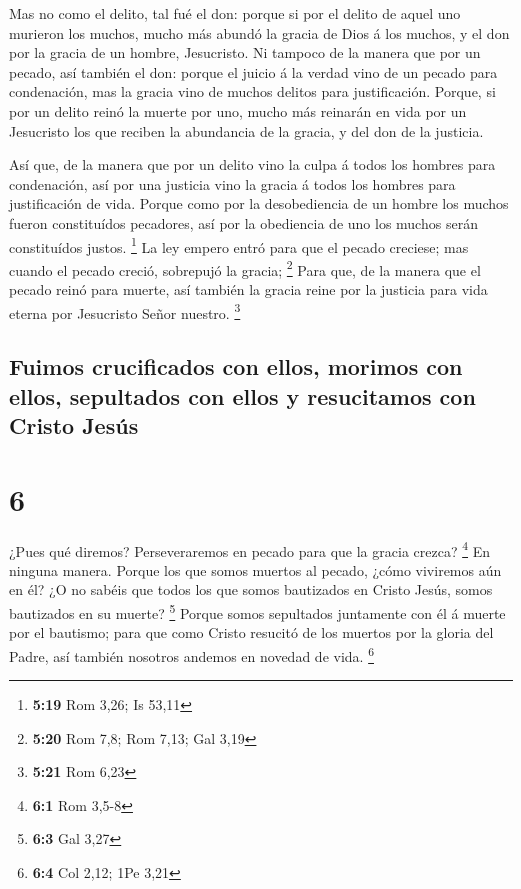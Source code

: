  Mas no como el delito, tal fué el don: porque si por el
delito de aquel uno murieron los muchos, mucho más abundó la gracia de
Dios á los muchos, y el don por la gracia de un hombre, Jesucristo.
 Ni tampoco de la manera que por un pecado, así también el
don: porque el juicio á la verdad vino de un pecado para condenación,
mas la gracia vino de muchos delitos para justificación. 
Porque, si por un delito reinó la muerte por uno, mucho más reinarán en
vida por un Jesucristo los que reciben la abundancia de la gracia, y del
don de la justicia.

 Así que, de la manera que por un delito vino la culpa á
todos los hombres para condenación, así por una justicia vino la gracia
á todos los hombres para justificación de vida.  Porque
como por la desobediencia de un hombre los muchos fueron constituídos
pecadores, así por la obediencia de uno los muchos serán constituídos
justos. \footnote{\textbf{5:19} Rom 3,26; Is 53,11}  La ley
empero entró para que el pecado creciese; mas cuando el pecado creció,
sobrepujó la gracia; \footnote{\textbf{5:20} Rom 7,8; Rom 7,13; Gal 3,19}
 Para que, de la manera que el pecado reinó para muerte,
así también la gracia reine por la justicia para vida eterna por
Jesucristo Señor nuestro. \footnote{\textbf{5:21} Rom 6,23}

\hypertarget{fuimos-crucificados-con-ellos-morimos-con-ellos-sepultados-con-ellos-y-resucitamos-con-cristo-jesuxfas}{%
\subsection{Fuimos crucificados con ellos, morimos con ellos, sepultados
con ellos y resucitamos con Cristo
Jesús}\label{fuimos-crucificados-con-ellos-morimos-con-ellos-sepultados-con-ellos-y-resucitamos-con-cristo-jesuxfas}}

\hypertarget{section-5}{%
\section{6}\label{section-5}}

 ¿Pues qué diremos? Perseveraremos en pecado para que la
gracia crezca? \footnote{\textbf{6:1} Rom 3,5-8}  En ninguna
manera. Porque los que somos muertos al pecado, ¿cómo viviremos aún en
él?  ¿O no sabéis que todos los que somos bautizados en
Cristo Jesús, somos bautizados en su muerte? \footnote{\textbf{6:3} Gal
  3,27}  Porque somos sepultados juntamente con él á muerte
por el bautismo; para que como Cristo resucitó de los muertos por la
gloria del Padre, así también nosotros andemos en novedad de vida.
\footnote{\textbf{6:4} Col 2,12; 1Pe 3,21}

